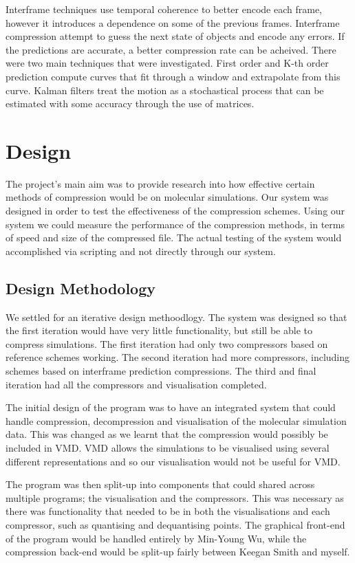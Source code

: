 \documentclass[a4paper,11pt]{report}
\begin{document}
Interframe techniques use temporal coherence to better encode each frame, however it introduces a dependence on some of the previous frames. Interframe compression attempt to guess the next state of objects and encode any errors. If the predictions are accurate, a better compression rate can be acheived. There were two main techniques that were investigated. First order and K-th order prediction compute curves that fit through a window and extrapolate from this curve. Kalman filters treat the motion as a stochastical process that can be estimated with some accuracy through the use of matrices.

\chapter{Design}

The project's main aim was to provide research into how effective certain methods of compression would be on molecular simulations. Our system was designed in order to test the effectiveness of the compression schemes. Using our system we could measure the performance of the compression methods, in terms of speed and size of the compressed file. The actual testing of the system would accomplished via scripting and not directly through our system.

\section{Design Methodology}

We settled for an iterative design methoodlogy. The system was designed so that the first iteration would have very little functionality, but still be able to compress simulations. The first iteration had only two compressors based on reference schemes working. The second iteration had more compressors, including schemes based on interframe prediction compressions. The third and final iteration had all the compressors and visualisation completed.

The initial design of the program was to have an integrated system that could handle compression, decompression and visualisation of the molecular simulation data. This was changed as we learnt that the compression would possibly be included in VMD. VMD allows the simulations to be visualised using several different representations and so our visualisation would not be useful for VMD.

The program was then split-up into components that could shared across multiple programs; the visualisation and the compressors. This was necessary as there was functionality that needed to be in both the visualisations and each compressor, such as quantising and dequantising points. The graphical front-end of the program would be handled entirely by Min-Young Wu, while the compression back-end would be split-up fairly between Keegan Smith and myself. 
\end{document}
